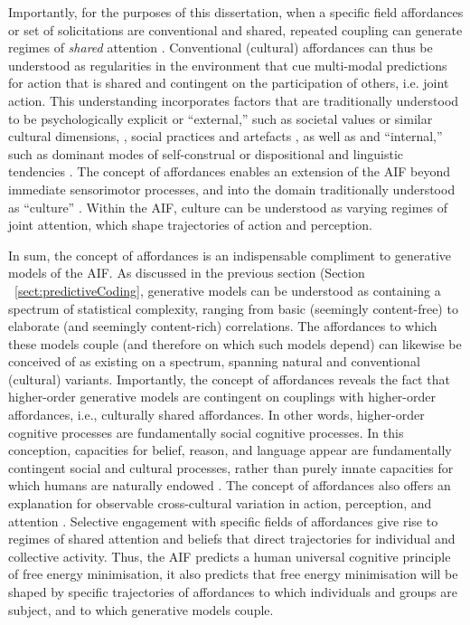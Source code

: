 \begin{CJK}{UTF8}{gbsn}
Importantly, for the purposes of this dissertation, when a specific field affordances or set of solicitations are conventional and shared, repeated coupling can generate regimes of \textit{shared} attention \citep{Ramstead2016}.  Conventional (cultural) affordances can thus be understood as regularities in the environment that cue multi-modal predictions for action that is shared and contingent on the participation of others, i.e. joint action.  This understanding incorporates factors that are traditionally understood to be psychologically explicit or ``external,'' such as societal values or similar cultural dimensions, \citep{Hofstede1991,Schwartz1992}, social practices and artefacts  \citep{Nisbett2003a}, as well as and ``internal,'' such as dominant modes of self-construal or dispositional and linguistic tendencies \citep{Markus1991}.  The concept of affordances enables an extension of the AIF beyond immediate sensorimotor processes, and into the domain traditionally understood as ``culture'' \citep{Roepstorff2010}.  Within the AIF, culture can be understood as varying regimes of joint attention, which shape trajectories of action and perception.

In sum, the concept of affordances is an indispensable compliment to generative models of the AIF.  As discussed in the previous section (Section ~\ref{sect:predictiveCoding}, generative models can be understood as containing a spectrum of statistical complexity, ranging from basic (seemingly content-free) to elaborate (and seemingly content-rich) correlations.  The affordances to which these models couple (and therefore on which such models depend) can likewise be conceived of as existing on a spectrum, spanning natural and conventional (cultural) variants.  Importantly, the concept of affordances reveals the fact that higher-order generative models are contingent on couplings with higher-order affordances, i.e., culturally shared affordances.  In other words, higher-order cognitive processes are fundamentally social cognitive processes. In this conception, capacities for belief, reason, and language appear are fundamentally contingent social and cultural processes, rather than purely innate capacities for which humans are naturally endowed  \citep{Sperber1997,Henrich2015}.  The concept of affordances also offers an explanation for observable cross-cultural variation in action, perception, and attention \citep[cf.][]{Nisbett2003}.  Selective engagement with specific fields of affordances give rise to regimes of shared attention and beliefs that direct trajectories for individual and collective activity.  Thus, the AIF predicts a human universal cognitive principle of free energy minimisation, it also predicts that free energy minimisation will be shaped by specific trajectories of affordances to which individuals and groups are subject, and to which generative models couple.



\end{CJK}
